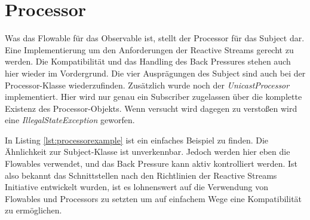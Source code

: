\section{Processor}
Was das Flowable für das Observable ist, stellt der Processor für das Subject dar. Eine Implementierung um den Anforderungen der Reactive Streams gerecht zu werden. Die Kompatibilität und das Handling des Back Pressures stehen auch hier wieder im Vordergrund. Die vier Ausprägungen des Subject sind auch bei der Processor-Klasse wiederzufinden. Zusätzlich wurde noch der \textit{UnicastProcessor} implementiert. Hier wird nur genau ein Subscriber zugelassen über die komplette Existenz des Processor-Objekts. Wenn versucht wird dagegen zu verstoßen wird eine \textit{IllegalStateException} geworfen.

In Listing \ref{lst:processorexample} ist ein einfaches Beispiel zu finden. Die Ähnlichkeit zur Subject-Klasse ist unverkennbar. Jedoch werden hier eben die Flowables verwendet, und das Back Pressure kann aktiv kontrolliert werden. Ist also bekannt das Schnittstellen nach den Richtlinien der Reactive Streams Initiative entwickelt wurden, ist es lohnenswert auf die Verwendung von Flowables und Processors zu setzten um auf einfachem Wege eine Kompatibilität zu ermöglichen.
